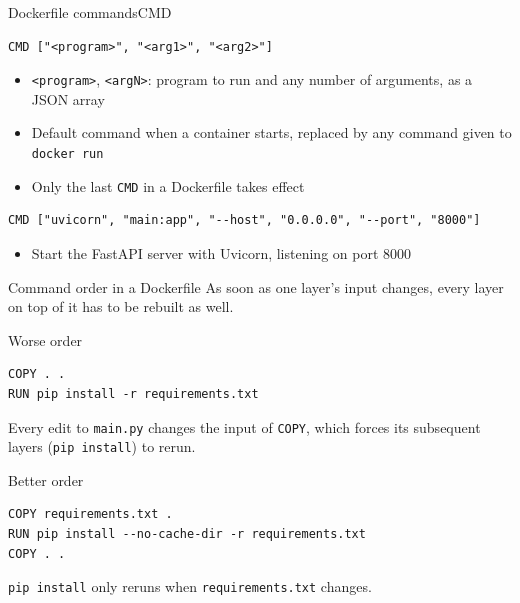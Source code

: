 \documentclass[aspectratio=169]{beamer}
\begin{document}
\begin{frame}[fragile]{Dockerfile commands}{CMD}
  \begin{verbatim}
CMD ["<program>", "<arg1>", "<arg2>"]
  \end{verbatim}
  \begin{itemize}
    \item \texttt{<program>}, \texttt{<argN>}: program to run and any number of arguments, as a JSON array
    \item Default command when a container starts, replaced by any command given to \texttt{docker run}
    \item Only the last \texttt{CMD} in a Dockerfile takes effect
  \end{itemize}

  \vspace{1em}

  \begin{verbatim}
CMD ["uvicorn", "main:app", "--host", "0.0.0.0", "--port", "8000"]
  \end{verbatim}
  \begin{itemize}
    \item Start the FastAPI server with Uvicorn, listening on port 8000
  \end{itemize}

\note{
}
\end{frame}


\begin{frame}[fragile]{Command order in a Dockerfile}
  As soon as one layer's input changes, every layer on top of it has to be rebuilt as well.

    \begin{block}{Worse order}
        \begin{verbatim}
COPY . .
RUN pip install -r requirements.txt
        \end{verbatim}
        Every edit to \texttt{main.py} changes the input of \texttt{COPY}, which forces its subsequent layers (\texttt{pip install}) to rerun.
    \end{block}

    \begin{block}{Better order}
        \begin{verbatim}
COPY requirements.txt .
RUN pip install --no-cache-dir -r requirements.txt
COPY . .
        \end{verbatim}
        \texttt{pip install} only reruns when \texttt{requirements.txt} changes.
    \end{block}
\note{
}
\end{frame}
\end{document}
